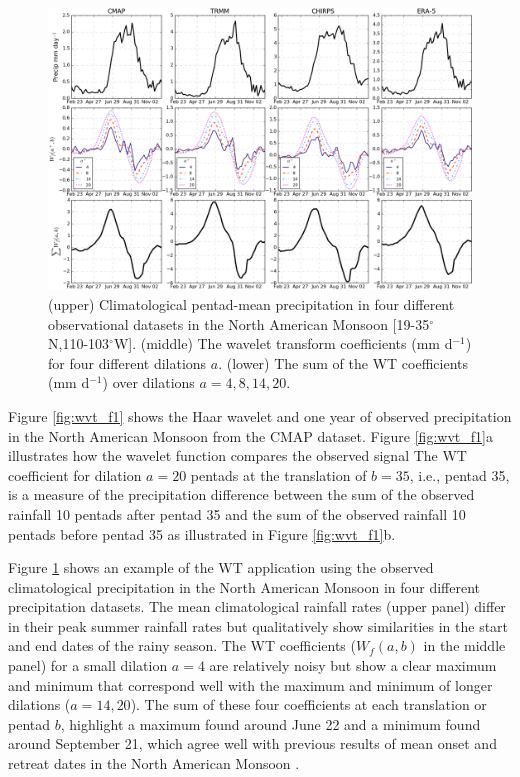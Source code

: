 \begin{figure}[t!]
\centering
 \includegraphics[width=\linewidth]{figures/wav_paperfig2.png}
\caption[Wavelet transform coefficient in North American Monsoon]{ (upper) Climatological pentad-mean precipitation in four different observational datasets in the North American Monsoon [19-35$^\circ$N,110-103$^\circ$W]. (middle) The wavelet transform coefficients (mm d$^{-1}$) for four different dilations $a$. (lower) The sum of the WT coefficients (mm d$^{-1}$) over dilations $a={4,8,14,20}$. }
\label{fig:wvt_f2}
\end{figure}

Figure \ref{fig:wvt_f1} shows the Haar wavelet and one year of observed precipitation in the North American Monsoon from the CMAP dataset. Figure \ref{fig:wvt_f1}a illustrates how the wavelet function compares the observed signal  The WT coefficient for dilation $a=20$ pentads at the translation of $b=35$, i.e., pentad 35, is a measure of the precipitation difference between the sum of the observed rainfall 10 pentads after pentad 35 and the sum of the observed rainfall 10 pentads before pentad 35 as illustrated in Figure \ref{fig:wvt_f1}b.


Figure \ref{fig:wvt_f2} shows an example of the WT application using the observed climatological precipitation in the North American Monsoon in four different precipitation datasets.
The mean climatological rainfall rates (upper panel) differ in their peak summer rainfall rates but qualitatively show similarities in the start and end dates of the rainy season. 
The WT coefficients ($W_f(a,b)$ in the middle panel) for a small dilation $a=4$ are relatively noisy but show a clear maximum and minimum that correspond well with the maximum and minimum of longer dilations ($a=14,20$). The sum of these four coefficients at each translation or pentad $b$, highlight a maximum found around June 22 and a minimum found around September 21, which agree well with previous results of mean onset and retreat dates in the North American Monsoon  \citep[e.g.][]{arias2012,geil2013}.


